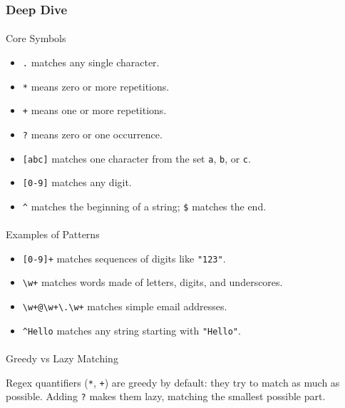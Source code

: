 \documentclass[
  letterpaper,
  DIV=11,
  numbers=noendperiod]{scrreprt}
\makeatletter
\let\oldparagraph\paragraph
\renewcommand{\paragraph}{
    \@ifstar
      \xxxParagraphStar
      \xxxParagraphNoStar
  }
\newcommand{\xxxParagraphStar}[1]{\oldparagraph*{#1}\mbox{}}
\newcommand{\xxxParagraphNoStar}[1]{\oldparagraph{#1}\mbox{}}
\providecommand{\tightlist}{%
  \setlength{\itemsep}{0pt}\setlength{\parskip}{0pt}}
\makeatother
\begin{document}
\subsubsection{Deep Dive}\label{deep-dive-32}

\paragraph{Core Symbols}\label{core-symbols}

\begin{itemize}
\tightlist
\item
  \texttt{.} matches any single character.
\item
  \texttt{*} means zero or more repetitions.
\item
  \texttt{+} means one or more repetitions.
\item
  \texttt{?} means zero or one occurrence.
\item
  \texttt{{[}abc{]}} matches one character from the set \texttt{a},
  \texttt{b}, or \texttt{c}.
\item
  \texttt{{[}0-9{]}} matches any digit.
\item
  \texttt{\^{}} matches the beginning of a string; \texttt{\$} matches
  the end.
\end{itemize}

\paragraph{Examples of Patterns}\label{examples-of-patterns}

\begin{itemize}
\tightlist
\item
  \texttt{{[}0-9{]}+} matches sequences of digits like \texttt{"123"}.
\item
  \texttt{\textbackslash{}w+} matches words made of letters, digits, and
  underscores.
\item
  \texttt{\textbackslash{}w+@\textbackslash{}w+\textbackslash{}.\textbackslash{}w+}
  matches simple email addresses.
\item
  \texttt{\^{}Hello} matches any string starting with \texttt{"Hello"}.
\end{itemize}

\paragraph{Greedy vs Lazy Matching}\label{greedy-vs-lazy-matching}

Regex quantifiers (\texttt{*}, \texttt{+}) are greedy by default: they
try to match as much as possible. Adding \texttt{?} makes them lazy,
matching the smallest possible part.
\end{document}
